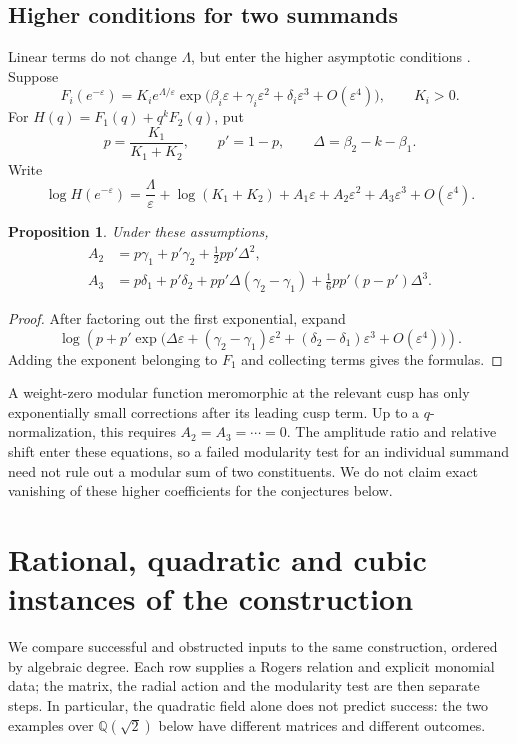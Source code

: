\documentclass[11pt,reqno]{amsart}
\newtheorem{proposition}[theorem]{Proposition}
\theoremstyle{remark}
\numberwithin{equation}{section}
\newcommand{\QQ}{\mathbb Q}
\begin{document}
\subsection{Higher conditions for two summands}\label{sec:higher}
Linear terms do not change $\Lambda$, but enter the higher asymptotic
conditions \cite{Kanade,Mizuno,VlasenkoZwegers}. Suppose
\[
 F_i(e^{-\varepsilon})=K_i e^{\Lambda/\varepsilon}
 \exp\bigl(\beta_i\varepsilon+\gamma_i\varepsilon^2+
 \delta_i\varepsilon^3+O(\varepsilon^4)\bigr),\qquad K_i>0.
\]
For $H(q)=F_1(q)+q^kF_2(q)$, put
\[
 p=\frac{K_1}{K_1+K_2},\qquad p'=1-p,\qquad
 \Delta=\beta_2-k-\beta_1.
\]
Write
\[
 \log H(e^{-\varepsilon})=
 \frac{\Lambda}{\varepsilon}+\log(K_1+K_2)
 +A_1\varepsilon+A_2\varepsilon^2+A_3\varepsilon^3+O(\varepsilon^4).
\]
\begin{proposition}\label{prop:higher}
Under these assumptions,
\begin{align}
 A_2&=p\gamma_1+p'\gamma_2+\frac12pp'\Delta^2,
 \label{eq:secondasy}\\
 A_3&=p\delta_1+p'\delta_2+pp'\Delta(\gamma_2-\gamma_1)
 +\frac16pp'(p-p')\Delta^3.\label{eq:thirdasy}
\end{align}
\end{proposition}
\begin{proof}
After factoring out the first exponential, expand
\[
 \log\!\left(p+p'\exp\bigl(\Delta\varepsilon+
 (\gamma_2-\gamma_1)\varepsilon^2+
 (\delta_2-\delta_1)\varepsilon^3+O(\varepsilon^4)\bigr)\right).
\]
Adding the exponent belonging to $F_1$ and collecting terms gives the
formulas.
\end{proof}
A weight-zero modular function meromorphic at the relevant cusp has only
exponentially small corrections after its leading cusp term. Up to a
$q$-normalization, this requires $A_2=A_3=\cdots=0$. The amplitude ratio
and relative shift enter these equations, so a failed modularity test for an
individual summand need not rule out a modular sum of two constituents.
We do not claim exact vanishing of these higher coefficients for the
conjectures below.


\section{Rational, quadratic and cubic instances of the construction}
\label{sec:examples}
We compare successful and obstructed inputs to the same construction,
ordered by algebraic degree. Each row supplies a Rogers relation and
explicit monomial data; the matrix, the radial action and the modularity
test are then separate steps. In particular, the quadratic field alone
does not predict success: the two examples over $\QQ(\sqrt2)$ below
have different matrices and different outcomes.
\end{document}
